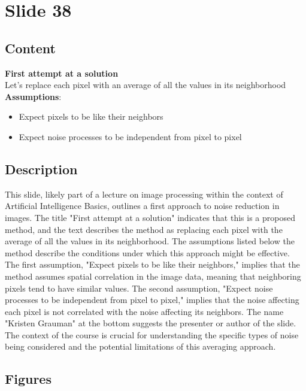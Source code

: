\documentclass{article}%
\begin{document}
%
\newpage%
\section{Slide 38}%
\label{sec:Slide38}%
\subsection{Content}%

\textbf{First attempt at a solution} \\
Let's replace each pixel with an average of all the values in its neighborhood \\
\textbf{Assumptions}: \\
\begin{itemize}
    \item Expect pixels to be like their neighbors
    \item Expect noise processes to be independent from pixel to pixel
\end{itemize}
%
\subsection{Description}%
This slide, likely part of a lecture on image processing within the context of Artificial Intelligence Basics, outlines a first approach to noise reduction in images.  The title "First attempt at a solution" indicates that this is a proposed method, and the text describes the method as replacing each pixel with the average of all the values in its neighborhood.  The assumptions listed below the method describe the conditions under which this approach might be effective.  The first assumption, "Expect pixels to be like their neighbors," implies that the method assumes spatial correlation in the image data, meaning that neighboring pixels tend to have similar values.  The second assumption, "Expect noise processes to be independent from pixel to pixel," implies that the noise affecting each pixel is not correlated with the noise affecting its neighbors.  The name "Kristen Grauman" at the bottom suggests the presenter or author of the slide.  The context of the course is crucial for understanding the specific types of noise being considered and the potential limitations of this averaging approach.%
\subsection{Figures}%
\begin{figure}[H]%
\centering%
\end{figure}
\end{document}
